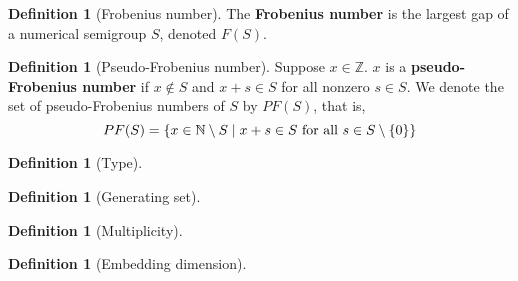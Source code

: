 \documentclass{article}
\theoremstyle{definition}
\theoremstyle{definition}
\newtheorem{defn}[thm]{Definition}
\theoremstyle{definition}
\begin{document}
\begin{defn}[Frobenius number]
    The \textbf{Frobenius number} is the largest gap of a numerical semigroup $S$, denoted $F(S)$.
\end{defn}

\begin{defn}[Pseudo-Frobenius number]
     Suppose $x\in \mathbb{Z}$. $x$ is a \textbf{pseudo-Frobenius number} if $x\notin S$ and $x+s\in S$ for all nonzero $s\in S$. We denote the set of pseudo-Frobenius numbers of $S$ by $PF(S)$, that is, 
     $$PF(S) = \{x\in \mathbb{N} \setminus S \mid x+s\in S \space \text{ for all } s\in S\setminus{\{0\}} \}$$
\end{defn}

\begin{defn}[Type]
    
\end{defn}

\begin{defn}[Generating set]
    
\end{defn}

\begin{defn}[Multiplicity]
    
\end{defn}

\begin{defn}[Embedding dimension]
    
\end{defn}
\end{document}
